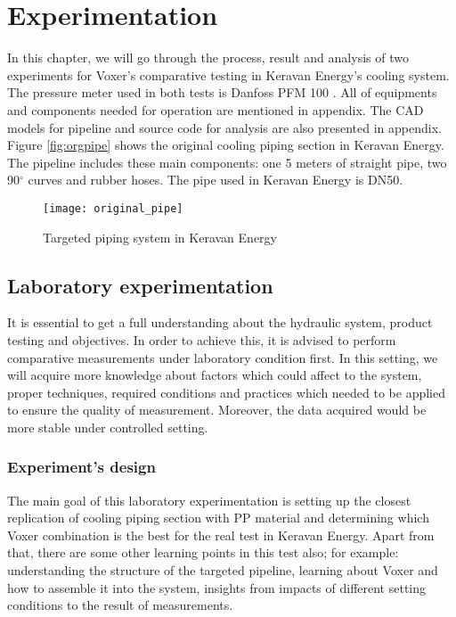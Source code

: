 
\chapter{Experimentation}

In this chapter, we will go through the process, result and analysis of two experiments for Voxer's comparative testing in Keravan Energy's cooling system. The pressure meter used in both tests is Danfoss PFM 100 \cite{danfoss:web}. All of equipments and components needed for operation are mentioned in appendix. The CAD models for pipeline and source code for analysis are also presented in appendix. Figure \vref{fig:orgpipe} shows the original cooling piping section in Keravan Energy. The pipeline includes these main components: one 5 meters of straight pipe, two 90$^{\circ}$ curves and rubber hoses. The pipe used in Keravan Energy is DN50.

\begin{figure}[h]
  \centering
  \texttt{[image: original\_pipe]}
  \caption{ Targeted piping system in Keravan Energy}
  \label{fig:orgpipe}
\end{figure}

\section{Laboratory experimentation}

It is essential to get a full understanding about the hydraulic system, product testing and objectives. In order to achieve this, it is advised to perform comparative measurements under laboratory condition first. In this setting, we will acquire more knowledge about factors which could affect to the system, proper techniques, required conditions and practices which needed to be applied to ensure the quality of measurement. Moreover, the data acquired would be more stable under controlled setting.

\subsection{Experiment's design}

The main goal of this laboratory experimentation is setting up the closest replication of cooling piping section with PP material and determining which Voxer combination is the best for the real test in Keravan Energy. Apart from that, there are some other learning points in this test also; for example: understanding the structure of the targeted pipeline, learning about Voxer and how to assemble it into the system, insights from impacts of different setting conditions to the result of measurements.

